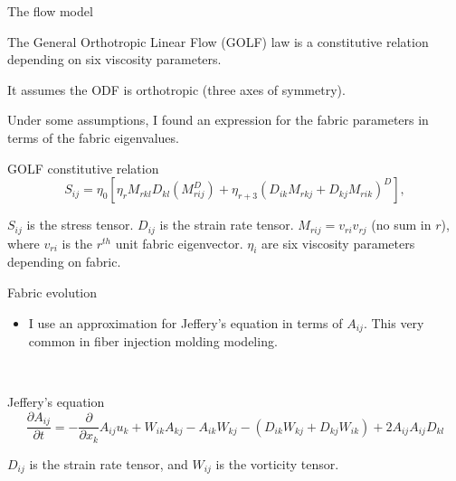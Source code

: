 \documentclass{beamer}
\begin{document}
\begin{frame}{The flow model}
   \begin{itemize}
         \small{
      \item The General Orthotropic Linear Flow (GOLF) law \citep{gillet2005} is a constitutive relation depending on six viscosity parameters.
      \item It assumes the ODF is orthotropic (three axes of symmetry).
      \item Under some assumptions, I found an expression for the fabric parameters in terms of the fabric eigenvalues.
      }
   \end{itemize}

   \begin{block}{GOLF constitutive relation}
   \begin{equation}
   S_{ij} = \eta_0 \left[ \eta_r M_{rkl} D_{kl} \left( M_{rij}^D \right)  + \eta_{r+3} \left( D_{ik} M_{rkj} + D_{kj} M_{rik} \right)^D \right],
\end{equation}

   \small{
      $S_{ij}$ is the stress tensor. $D_{ij}$ is the strain rate tensor. $M_{rij} = v_{ri}v_{rj}$ (no sum in $r$), where $v_{ri}$ is the $r^{th}$ unit fabric eigenvector. $\eta_i$ are six viscosity parameters depending on fabric.
}
\end{block}
\end{frame}

\begin{frame}{Fabric evolution}
   \begin{itemize}
      \item I use an approximation for Jeffery's equation in terms of $A_{ij}$. This very common in fiber injection molding modeling. 
   \end{itemize} \\
   \begin{block}{Jeffery's equation}
   \begin{equation}
      \frac{\partial A_{ij}}{\partial t} = -\frac{\partial}{\partial x_k} A_{ij} u_k + W_{ik} A_{kj} - A_{ik} W_{kj} - (D_{ik}W_{kj} + D_{kj}W_{ik}) + 2 A_{ij} A_{ij} D_{kl}
   \end{equation}

   $D_{ij}$ is the strain rate tensor, and $W_{ij}$ is the vorticity tensor.
\end{block}
\end{frame}
\end{document}
